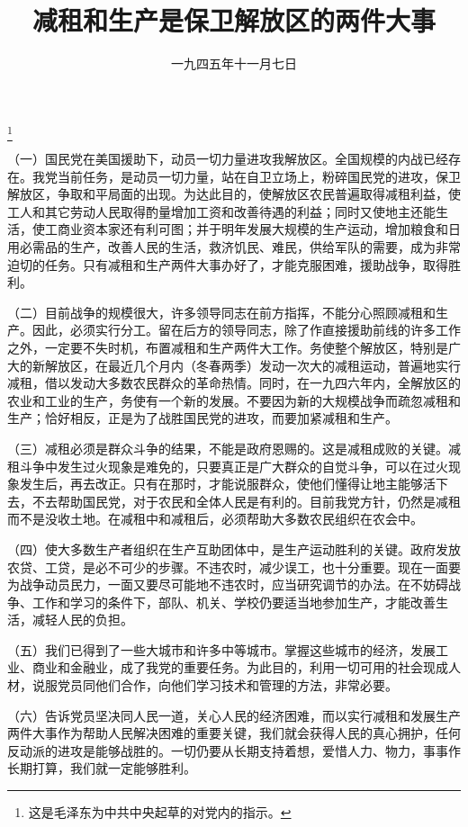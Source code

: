 
\title{减租和生产是保卫解放区的两件大事}
\date{一九四五年十一月七日}
\thanks{这是毛泽东为中共中央起草的对党内的指示。}
\maketitle


（一）国民党在美国援助下，动员一切力量进攻我解放区。全国规模的内战已经存在。我党当前任务，是动员一切力量，站在自卫立场上，粉碎国民党的进攻，保卫解放区，争取和平局面的出现。为达此目的，使解放区农民普遍取得减租利益，使工人和其它劳动人民取得酌量增加工资和改善待遇的利益；同时又使地主还能生活，使工商业资本家还有利可图；并于明年发展大规模的生产运动，增加粮食和日用必需品的生产，改善人民的生活，救济饥民、难民，供给军队的需要，成为非常迫切的任务。只有减租和生产两件大事办好了，才能克服困难，援助战争，取得胜利。

（二）目前战争的规模很大，许多领导同志在前方指挥，不能分心照顾减租和生产。因此，必须实行分工。留在后方的领导同志，除了作直接援助前线的许多工作之外，一定要不失时机，布置减租和生产两件大工作。务使整个解放区，特别是广大的新解放区，在最近几个月内（冬春两季）发动一次大的减租运动，普遍地实行减租，借以发动大多数农民群众的革命热情。同时，在一九四六年内，全解放区的农业和工业的生产，务使有一个新的发展。不要因为新的大规模战争而疏忽减租和生产；恰好相反，正是为了战胜国民党的进攻，而要加紧减租和生产。

（三）减租必须是群众斗争的结果，不能是政府恩赐的。这是减租成败的关键。减租斗争中发生过火现象是难免的，只要真正是广大群众的自觉斗争，可以在过火现象发生后，再去改正。只有在那时，才能说服群众，使他们懂得让地主能够活下去，不去帮助国民党，对于农民和全体人民是有利的。目前我党方针，仍然是减租而不是没收土地。在减租中和减租后，必须帮助大多数农民组织在农会中。

（四）使大多数生产者组织在生产互助团体中，是生产运动胜利的关键。政府发放农贷、工贷，是必不可少的步骤。不违农时，减少误工，也十分重要。现在一面要为战争动员民力，一面又要尽可能地不违农时，应当研究调节的办法。在不妨碍战争、工作和学习的条件下，部队、机关、学校仍要适当地参加生产，才能改善生活，减轻人民的负担。

（五）我们已得到了一些大城市和许多中等城市。掌握这些城市的经济，发展工业、商业和金融业，成了我党的重要任务。为此目的，利用一切可用的社会现成人材，说服党员同他们合作，向他们学习技术和管理的方法，非常必要。

（六）告诉党员坚决同人民一道，关心人民的经济困难，而以实行减租和发展生产两件大事作为帮助人民解决困难的重要关键，我们就会获得人民的真心拥护，任何反动派的进攻是能够战胜的。一切仍要从长期支持着想，爱惜人力、物力，事事作长期打算，我们就一定能够胜利。
